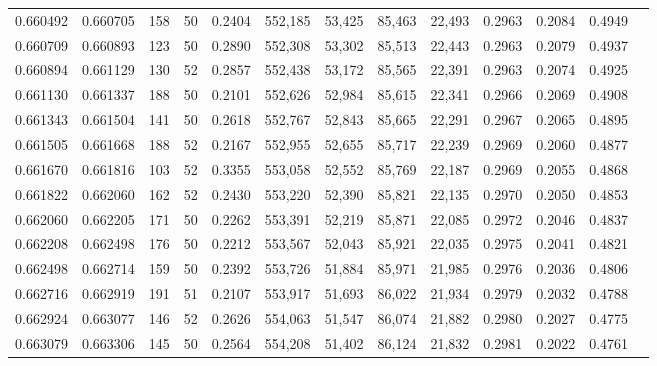 \begin{tabular}{rrrrrrrrrrrrr}
0.660492 & 0.660705 &   158 &  50 &                                     0.2404 & 552,185 &  53,425 &  85,463 &  22,493 & 0.2963 & 0.2084 & 0.4949 \\
0.660709 & 0.660893 &   123 &  50 &                                     0.2890 & 552,308 &  53,302 &  85,513 &  22,443 & 0.2963 & 0.2079 & 0.4937 \\
0.660894 & 0.661129 &   130 &  52 &                                     0.2857 & 552,438 &  53,172 &  85,565 &  22,391 & 0.2963 & 0.2074 & 0.4925 \\
0.661130 & 0.661337 &   188 &  50 &                                     0.2101 & 552,626 &  52,984 &  85,615 &  22,341 & 0.2966 & 0.2069 & 0.4908 \\
0.661343 & 0.661504 &   141 &  50 &                                     0.2618 & 552,767 &  52,843 &  85,665 &  22,291 & 0.2967 & 0.2065 & 0.4895 \\
0.661505 & 0.661668 &   188 &  52 &                                     0.2167 & 552,955 &  52,655 &  85,717 &  22,239 & 0.2969 & 0.2060 & 0.4877 \\
0.661670 & 0.661816 &   103 &  52 &                                     0.3355 & 553,058 &  52,552 &  85,769 &  22,187 & 0.2969 & 0.2055 & 0.4868 \\
0.661822 & 0.662060 &   162 &  52 &                                     0.2430 & 553,220 &  52,390 &  85,821 &  22,135 & 0.2970 & 0.2050 & 0.4853 \\
0.662060 & 0.662205 &   171 &  50 &                                     0.2262 & 553,391 &  52,219 &  85,871 &  22,085 & 0.2972 & 0.2046 & 0.4837 \\
0.662208 & 0.662498 &   176 &  50 &                                     0.2212 & 553,567 &  52,043 &  85,921 &  22,035 & 0.2975 & 0.2041 & 0.4821 \\
0.662498 & 0.662714 &   159 &  50 &                                     0.2392 & 553,726 &  51,884 &  85,971 &  21,985 & 0.2976 & 0.2036 & 0.4806 \\
0.662716 & 0.662919 &   191 &  51 &                                     0.2107 & 553,917 &  51,693 &  86,022 &  21,934 & 0.2979 & 0.2032 & 0.4788 \\
0.662924 & 0.663077 &   146 &  52 &                                     0.2626 & 554,063 &  51,547 &  86,074 &  21,882 & 0.2980 & 0.2027 & 0.4775 \\
0.663079 & 0.663306 &   145 &  50 &                                     0.2564 & 554,208 &  51,402 &  86,124 &  21,832 & 0.2981 & 0.2022 & 0.4761 \\

\end{tabular}

